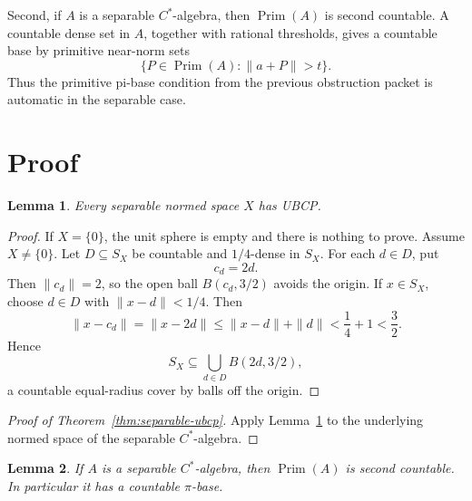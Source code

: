 \documentclass[11pt]{article}
\newtheorem{lemma}{Lemma}
\newcommand{\Prim}{\operatorname{Prim}}
\begin{document}
Second, if \(A\) is a separable \(C^*\)-algebra, then \(\Prim(A)\) is second
countable.  A countable dense set in \(A\), together with rational thresholds,
gives a countable base by primitive near-norm sets
\[
        \{P\in\Prim(A):\|a+P\|>t\}.
\]
Thus the primitive pi-base condition from the previous obstruction packet is
automatic in the separable case.

\section*{Proof}

\begin{lemma}
\label{lem:separable-normed-ubcp}
Every separable normed space \(X\) has UBCP.
\end{lemma}

\begin{proof}
If \(X=\{0\}\), the unit sphere is empty and there is nothing to prove.  Assume
\(X\ne\{0\}\).  Let \(D\subseteq S_X\) be countable and \(1/4\)-dense in
\(S_X\).  For each \(d\in D\), put
\[
        c_d=2d.
\]
Then \(\|c_d\|=2\), so the open ball \(B(c_d,3/2)\) avoids the origin.  If
\(x\in S_X\), choose \(d\in D\) with \(\|x-d\|<1/4\).  Then
\[
        \|x-c_d\|
        =
        \|x-2d\|
        \le
        \|x-d\|+\|d\|
        <
        \frac14+1
        <
        \frac32.
\]
Hence
\[
        S_X\subseteq \bigcup_{d\in D} B(2d,3/2),
\]
a countable equal-radius cover by balls off the origin.
\end{proof}

\begin{proof}[Proof of Theorem~\ref{thm:separable-ubcp}]
Apply Lemma~\ref{lem:separable-normed-ubcp} to the underlying normed space of
the separable \(C^*\)-algebra.
\end{proof}

\begin{lemma}
\label{lem:prim-second-countable}
If \(A\) is a separable \(C^*\)-algebra, then \(\Prim(A)\) is second
countable.  In particular it has a countable \(\pi\)-base.
\end{lemma}
\end{document}
